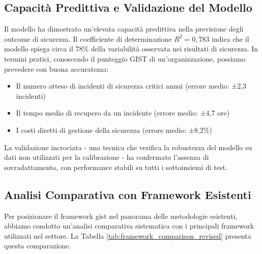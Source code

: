 \subsection{\texorpdfstring{Capacità Predittiva e Validazione del Modello}{5.3.2 - Capacità Predittiva e Validazione del Modello}}
\label{subsec:5.3.2}

Il modello ha dimostrato un'elevata capacità predittiva nella previsione degli outcome di sicurezza. Il coefficiente di determinazione $R^2 = 0,783$ indica che il modello spiega circa il 78\% della variabilità osservata nei risultati di sicurezza. In termini pratici, conoscendo il punteggio GIST di un'organizzazione, possiamo prevedere con buona accuratezza:
\begin{itemize}
\item Il numero atteso di incidenti di sicurezza critici annui (errore medio: ±2,3 incidenti)
\item Il tempo medio di recupero da un incidente (errore medio: ±4,7 ore)
\item I costi diretti di gestione della sicurezza (errore medio: ±8,2\%)
\end{itemize}

La validazione incrociata - una tecnica che verifica la robustezza del modello su dati non utilizzati per la calibrazione - ha confermato l'assenza di sovradattamento, con performance stabili su tutti i sottoinsiemi di test.

\subsection{\texorpdfstring{Analisi Comparativa con Framework Esistenti}{5.3.3 - Analisi Comparativa con Framework Esistenti}}
\label{subsec:5.3.3}

Per posizionare il framework \gls{gist} nel panorama delle metodologie esistenti, abbiamo condotto un'analisi comparativa sistematica con i principali framework utilizzati nel settore. La Tabella \ref{tab:framework_comparison_revised} presenta questa comparazione.

